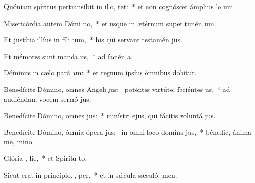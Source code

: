 \item Quóniam spíritus pertransíbit in illo,   tet:~* et non cognóscet ámplius lo um.
\item Misericórdia autem Dómi  no,~* et usque in ætérnum super timén um.
\item Et justítia illíus in fíli rum,~* his qui servant testamén jus.
\item Et mémores sunt manda us,~* ad facién a.
\item Dóminus in cælo pará  am:~* et regnum ipsíus ómnibus dobitur.
\item Benedícite Dómino, omnes Angeli jus:~\pscross{} poténtes virtúte, faciéntes  us,~* ad audiéndam vocem sermó jus.
\item Benedícite Dómino, omnes  jus:~* minístri ejus, qui fácitis voluntá jus.
\item Benedícite Dómino, ómnia ópera jus:~\pscross{} in omni loco domina jus,~* bénedic, ánima me, mino.
\item Glória ,  lio,~* et Spirítu to.
\item Sicut erat in princípio,  ,  per,~* et in sǽcula sæculó. men.
